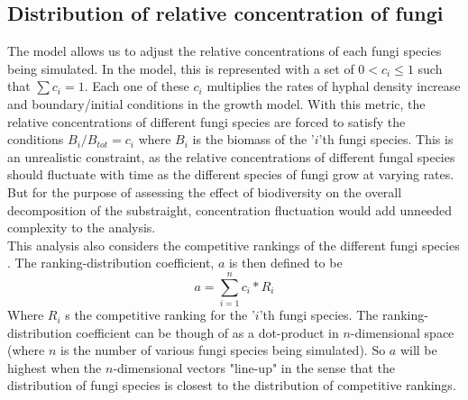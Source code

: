 \documentclass{article}
\begin{document}
\subsection*{Distribution of relative concentration of fungi}
The model allows us to adjust the relative concentrations of each fungi species being simulated. In the model, this is represented with a set of $0<c_{i}\leq 1$ such that $\sum c_{i} = 1$. Each one of these $c_{i}$ multiplies the rates of hyphal density increase and boundary/initial conditions in the growth model. With this metric, the relative concentrations of different fungi species are forced to satisfy the conditions $B_{i}/B_{tot}=c_{i}$ where $B_{i}$ is the biomass of the '$i$'th fungi species. This is an unrealistic constraint, as the relative concentrations of different fungal species should fluctuate with time as the different species of fungi grow at varying rates. But for the purpose of assessing the effect of biodiversity on the overall decomposition of the substraight, concentration fluctuation would add unneeded complexity to the analysis. \\
This analysis also considers the competitive rankings of the different fungi species \cite{Maynard2019}. The ranking-distribution coefficient, $a$ is then defined to be
\begin{equation} \label{eq}
    a = \sum_{i=1}^{n} c_{i}*R_{i}
\end{equation}
Where $R_{i}$ s the competitive ranking for the '$i$'th fungi species. The ranking-distribution coefficient can be though of as a dot-product in $n$-dimensional space (where $n$ is the number of various fungi species being simulated). So $a$ will be highest when the $n$-dimensional vectors "line-up" in the sense that the distribution of fungi species is closest to the distribution of competitive rankings.\\
\end{document}
